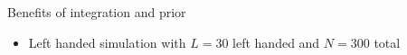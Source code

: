 \documentclass[english,t]{beamer}
\begin{document}
\begin{frame}{Benefits of integration and prior}

  \begin{itemize}
  \item Left handed simulation with $L=30$ left handed and $N=300$ total
  \end{itemize}
  

\end{frame}


  
\end{document}
